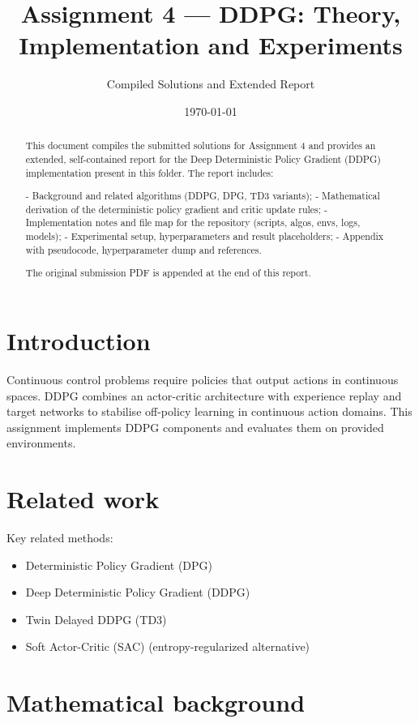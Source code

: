 \documentclass[11pt]{article}
\title{Assignment 4 — DDPG: Theory, Implementation and Experiments}
\author{Compiled Solutions and Extended Report}
\date{\today}
\begin{document}
\maketitle

\begin{abstract}
This document compiles the submitted solutions for Assignment 4 and provides an extended, self-contained report for the Deep Deterministic Policy Gradient (DDPG) implementation present in this folder. The report includes:

- Background and related algorithms (DDPG, DPG, TD3 variants);
- Mathematical derivation of the deterministic policy gradient and critic update rules;
- Implementation notes and file map for the repository (scripts, algos, envs, logs, models);
- Experimental setup, hyperparameters and result placeholders;
- Appendix with pseudocode, hyperparameter dump and references.

The original submission PDF is appended at the end of this report.
\end{abstract}

\tableofcontents
\clearpage

\section{Introduction}
Continuous control problems require policies that output actions in continuous spaces. DDPG \cite{lillicrap2015continuous} combines an actor-critic architecture with experience replay and target networks to stabilise off-policy learning in continuous action domains. This assignment implements DDPG components and evaluates them on provided environments.

\section{Related work}
Key related methods:
\begin{itemize}
  \item Deterministic Policy Gradient (DPG) \cite{silver2014deterministic}
  \item Deep Deterministic Policy Gradient (DDPG) \cite{lillicrap2015continuous}
  \item Twin Delayed DDPG (TD3) \cite{fujimoto2018addressing}
  \item Soft Actor-Critic (SAC) \cite{haarnoja2018soft} (entropy-regularized alternative)
\end{itemize}

\section{Mathematical background}
\end{document}
